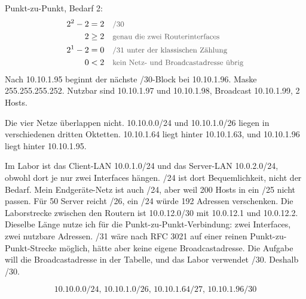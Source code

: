 \documentclass[a4paper,11pt]{article}
\newif\ifexplain
\newcommand{\why}[1]{\text{\small\color{black!65}#1}}
\newcommand{\explain}[1]{\ifexplain\begin{erklbox}#1\end{erklbox}\fi}
\begin{document}
Punkt-zu-Punkt, Bedarf 2:
\begin{align*}
2^{2}-2 &= 2 && \why{/30}\\
2 &\ge 2 && \why{genau die zwei Routerinterfaces}\\
2^{1}-2 &= 0 && \why{/31 unter der klassischen Zählung}\\
0 &< 2 && \why{kein Netz- und Broadcastadresse übrig}
\end{align*}
Nach 10.10.1.95 beginnt der nächste /30-Block bei 10.10.1.96. Maske 255.255.255.252. Nutzbar sind 10.10.1.97 und 10.10.1.98, Broadcast 10.10.1.99, 2 Hosts.

Die vier Netze überlappen nicht. 10.10.0.0/24 und 10.10.1.0/26 liegen in verschiedenen dritten Oktetten. 10.10.1.64 liegt hinter 10.10.1.63, und 10.10.1.96 liegt hinter 10.10.1.95.

Im Labor ist das Client-LAN 10.0.1.0/24 und das Server-LAN 10.0.2.0/24, obwohl dort je nur zwei Interfaces hängen. /24 ist dort Bequemlichkeit, nicht der Bedarf. Mein Endgeräte-Netz ist auch /24, aber weil 200 Hosts in ein /25 nicht passen. Für 50 Server reicht /26, ein /24 würde 192 Adressen verschenken. Die Laborstrecke zwischen den Routern ist 10.0.12.0/30 mit 10.0.12.1 und 10.0.12.2. Dieselbe Länge nutze ich für die Punkt-zu-Punkt-Verbindung: zwei Interfaces, zwei nutzbare Adressen. /31 wäre nach RFC 3021 auf einer reinen Punkt-zu-Punkt-Strecke möglich, hätte aber keine eigene Broadcastadresse. Die Aufgabe will die Broadcastadresse in der Tabelle, und das Labor verwendet /30. Deshalb /30.

\explain{VLSM heißt nur: die Präfixe dürfen verschieden lang sein, die Blöcke müssen an ihrer eigenen Größe ausgerichtet sein. Ein /27 darf nicht bei 10.10.1.50 anfangen. 64 ist durch 32 teilbar, 96 durch 4. Deshalb die Sprünge 0, 64 und 96 im dritten Netz. Wer überall /24 nimmt, erfüllt den Hostbedarf auch, verbraucht aber viermal so viel Adressraum für Server und Management.}
\[\boxed{\text{10.10.0.0/24, 10.10.1.0/26, 10.10.1.64/27, 10.10.1.96/30}}\]
\end{document}
